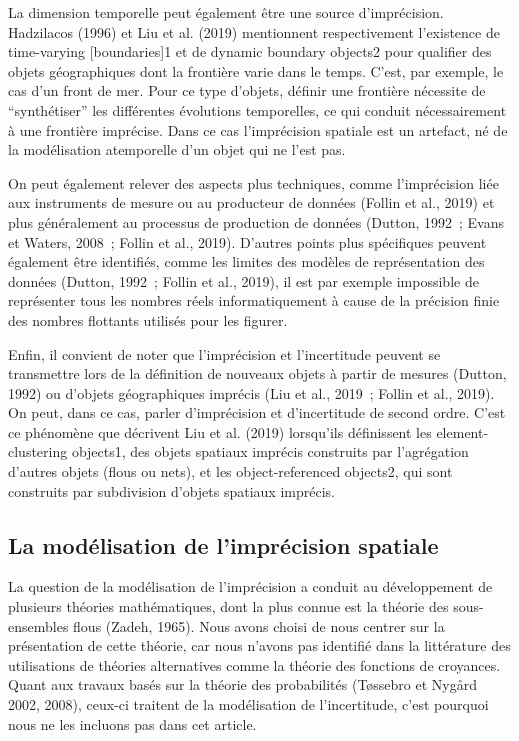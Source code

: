 La dimension temporelle peut également être une source
d’imprécision. Hadzilacos (1996) et Liu et al. (2019) mentionnent
respectivement l’existence de time-varying [boundaries]1 et de dynamic
boundary objects2 pour qualifier des objets géographiques dont la
frontière varie dans le temps. C’est, par exemple, le cas d’un front
de mer. Pour ce type d’objets, définir une frontière nécessite de
“synthétiser” les différentes évolutions temporelles, ce qui conduit
nécessairement à une frontière imprécise. Dans ce cas l’imprécision
spatiale est un artefact, né de la modélisation atemporelle d’un objet
qui ne l’est pas.

On peut également relever des aspects plus techniques, comme
l’imprécision liée aux instruments de mesure ou au producteur de
données (Follin et al., 2019) et plus généralement au processus de
production de données (Dutton, 1992 ; Evans et Waters, 2008 ; Follin
et al., 2019). D’autres points plus spécifiques peuvent également être
identifiés, comme les limites des modèles de représentation des
données (Dutton, 1992 ; Follin et al., 2019), il est par exemple
impossible de représenter tous les nombres réels informatiquement à
cause de la précision finie des nombres flottants utilisés pour les
figurer.

Enfin, il convient de noter que l’imprécision et l’incertitude peuvent
se transmettre lors de la définition de nouveaux objets à partir de
mesures (Dutton, 1992) ou d’objets géographiques imprécis (Liu et al.,
2019 ; Follin et al., 2019). On peut, dans ce cas, parler
d’imprécision et d’incertitude de second ordre. C’est ce phénomène que
décrivent Liu et al. (2019) lorsqu’ils définissent les
element-clustering objects1, des objets spatiaux imprécis construits
par l’agrégation d’autres objets (flous ou nets), et les
object-referenced objects2, qui sont construits par subdivision
d’objets spatiaux imprécis.

\subsection{La modélisation de l'imprécision spatiale}

La question de la modélisation de l’imprécision a conduit au
développement de plusieurs théories mathématiques, dont la plus connue
est la théorie des sous-ensembles flous (Zadeh, 1965). Nous avons
choisi de nous centrer sur la présentation de cette théorie, car nous
n’avons pas identifié dans la littérature des utilisations de théories
alternatives comme la théorie des fonctions de croyances. Quant aux
travaux basés sur la théorie des probabilités (Tøssebro et Nygård
2002, 2008), ceux-ci traitent de la modélisation de l’incertitude,
c’est pourquoi nous ne les incluons pas dans cet article.

